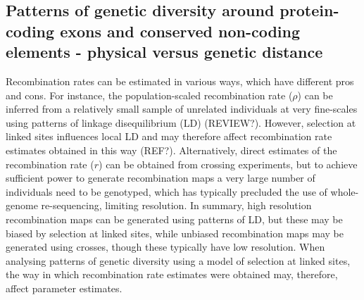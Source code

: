 \documentclass[11pt]{article}
\begin{document}
\subsection*{Patterns of genetic diversity around protein-coding exons and conserved non-coding elements - physical versus genetic distance}

\begin{figure}[h]
   \centering      
   \noindent{}
 \caption[The ]
 
 \label{fig:1}
\end{figure}

	Recombination rates can be estimated in various ways, which have different pros and cons. For instance, the population-scaled recombination rate ($\rho$) can be inferred from a relatively small sample of unrelated individuals at very fine-scales using patterns of linkage disequilibrium (LD) (REVIEW?). However, selection at linked sites influences local LD and may therefore affect recombination rate estimates obtained in this way (REF?). Alternatively, direct estimates of the recombination rate ($r$) can be obtained from crossing experiments, but to achieve sufficient power to generate recombination maps a very large number of individuals need to be genotyped, which has typically precluded the use of whole-genome re-sequencing, limiting resolution. In summary, high resolution recombination maps can be generated using patterns of LD, but these may be biased by selection at linked sites, while unbiased recombination maps may be generated using crosses, though these typically have low resolution. When analysing patterns of genetic diversity using a model of selection at linked sites, the way in which recombination rate estimates were obtained may, therefore, affect parameter estimates.
\end{document}
